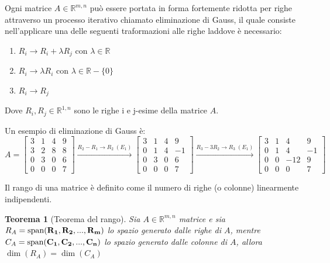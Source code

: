 \documentclass{article}
\newtheorem{theorem}{Teorema}
\begin{document}
    \vspace{10pt}
    Ogni matrice $A \in \mathbb{R}^{m, n}$ può essere portata in forma fortemente ridotta per righe attraverso un processo iterativo chiamato
    eliminazione di Gauss, il quale consiste nell'applicare una delle seguenti traformazioni alle righe laddove è necessario:
    \begin{enumerate}[label=(E\textsubscript{\arabic*}), leftmargin=1cm]
        \item $R_i \rightarrow R_i + \lambda R_j$ con $\lambda \in \mathbb{R}$ 
        \item $R_i \rightarrow \lambda R_i$ con $\lambda \in \mathbb{R} - \{0\}$ 
        \item $R_i \rightarrow R_j$ 
    \end{enumerate}
    Dove $R_i, R_j \in \mathbb{R}^{1, n}$ sono le righe i e j-esime della matrice $A$.

    \vspace{10pt}
    Un esempio di eliminazione di Gauss è:
    \[
        A = 
        \begin{bmatrix}
            3 & 1 & 4 & 9 \\
            3 & 2 & 8 & 8 \\
            0 & 3 & 0 & 6 \\
            0 & 0 & 0 & 7 
        \end{bmatrix} 
        \xrightarrow{R_2 - R_1 \rightarrow R_2 \; (E_1)}
        \begin{bmatrix}
            3 & 1 & 4 & 9 \\
            0 & 1 & 4 & -1 \\
            0 & 3 & 0 & 6 \\
            0 & 0 & 0 & 7 
        \end{bmatrix} 
        \xrightarrow{R_3 - 3 R_2 \rightarrow R_3 \; (E_1)}
        \begin{bmatrix}
            3 & 1 & 4 & 9 \\
            0 & 1 & 4 & -1 \\
            0 & 0 & -12 & 9 \\
            0 & 0 & 0 & 7 
        \end{bmatrix} 
    \]
    
    \vspace{10pt}
    Il rango di una matrice è definito come il numero di righe (o colonne) linearmente indipendenti.

    \vspace{10pt}
    \begin{theorem}[Teorema del rango]
        Sia $A \in \mathbb{R}^{m, n}$ matrice e sia $R_A = \textnormal{span}(\mathbf{R_1}, \mathbf{R_2}, ..., \mathbf{R_m})$ lo spazio generato dalle righe di $A$, mentre $C_A = \textnormal{span}(\mathbf{C_1}, \mathbf{C_2}, ..., \mathbf{C_n})$ lo spazio
        generato dalle colonne di $A$, allora $\dim(R_A) = \dim(C_A)$     
    \end{theorem}
\end{document}
